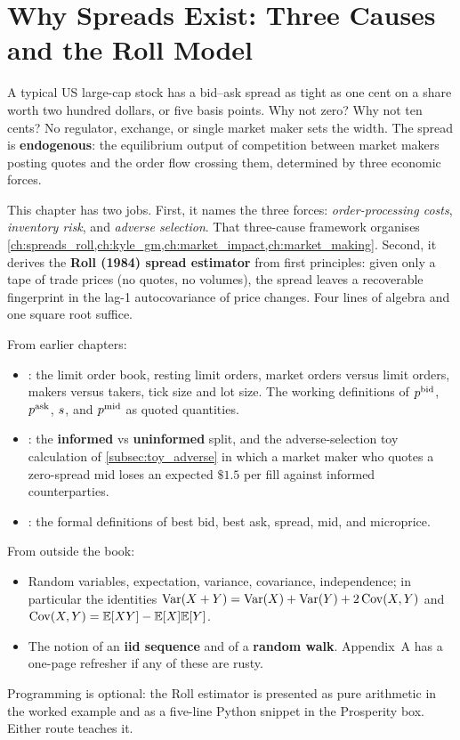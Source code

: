 \chapter{Why Spreads Exist: Three Causes and the Roll Model}
\label{ch:spreads_roll}

A typical US large-cap stock has a bid--ask spread as tight as
one cent on a share worth two hundred dollars, or five basis points.
Why not zero? Why not ten cents? No regulator, exchange, or single
market maker sets the width. The spread is \textbf{endogenous}: the
equilibrium output of competition between market makers posting
quotes and the order flow crossing them, determined by three
economic forces.

This chapter has two jobs. First, it names the three forces:
\emph{order-processing costs}, \emph{inventory risk}, and
\emph{adverse selection}. That three-cause framework
\citeHasbrouck{} organises
\cref{ch:spreads_roll,ch:kyle_gm,ch:market_impact,ch:market_making}.
Second, it derives the \textbf{Roll (1984) spread estimator}
\citeRoll{} from first principles: given only a tape of trade
prices (no quotes, no volumes), the spread leaves a recoverable
fingerprint in the lag-1 autocovariance of price changes. Four
lines of algebra and one square root suffice.

\begin{backgroundbox}[Prerequisites]
From earlier chapters:
\begin{itemize}
  \item {}: the limit order book, resting limit orders,
  market orders versus limit orders, makers versus takers, tick size
  and lot size. The working definitions of $p^{\mathrm{bid}}$, $p^{\mathrm{ask}}$,
  $s$, and $p^{\mathrm{mid}}$ as quoted quantities.
  \item {}: the \textbf{informed} vs
  \textbf{uninformed} split, and the adverse-selection toy
  calculation of \cref{subsec:toy_adverse} in which a market maker
  who quotes a zero-spread mid loses an expected $\$1.5$ per fill
  against informed counterparties.
  \item {}: the formal definitions of best bid,
  best ask, spread, mid, and microprice.
\end{itemize}
From outside the book:
\begin{itemize}
  \item Random variables, expectation, variance, covariance,
  independence; in particular the identities
  $\operatorname{Var}(X+Y) = \operatorname{Var}(X) + \operatorname{Var}(Y) + 2\operatorname{Cov}(X,Y)$ and
  $\operatorname{Cov}(X,Y) = \mathbb{E}[XY] - \mathbb{E}[X]\mathbb{E}[Y]$.
  \item The notion of an \textbf{iid sequence} and of a
  \textbf{random walk}. Appendix~A has a one-page refresher if any
  of these are rusty.
\end{itemize}
Programming is optional: the Roll estimator is presented as pure
arithmetic in the worked example and as a five-line Python snippet
in the Prosperity box. Either route teaches it.
\end{backgroundbox}

